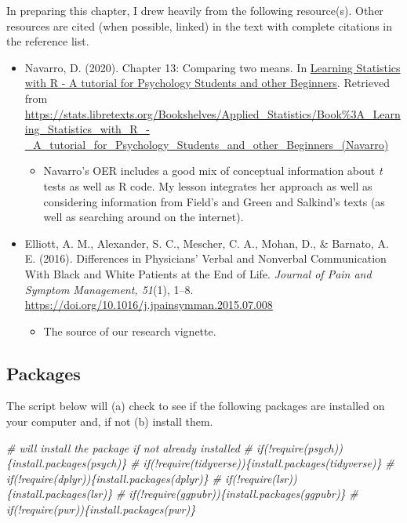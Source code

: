 \documentclass[
  11pt,
]{book}
\newenvironment{Shaded}{\begin{snugshade}}{\end{snugshade}}
\newcommand{\CommentTok}[1]{\textcolor[rgb]{0.56,0.35,0.01}{\textit{#1}}}
\providecommand{\tightlist}{%
  \setlength{\itemsep}{0pt}\setlength{\parskip}{0pt}}
\begin{document}
In preparing this chapter, I drew heavily from the following resource(s). Other resources are cited (when possible, linked) in the text with complete citations in the reference list.

\begin{itemize}
\tightlist
\item
  Navarro, D. (2020). Chapter 13: Comparing two means. In \href{https://learningstatisticswithr.com/}{Learning Statistics with R - A tutorial for Psychology Students and other Beginners}. Retrieved from \url{https://stats.libretexts.org/Bookshelves/Applied_Statistics/Book\%3A_Learning_Statistics_with_R_-_A_tutorial_for_Psychology_Students_and_other_Beginners_(Navarro)}

  \begin{itemize}
  \tightlist
  \item
    Navarro's OER includes a good mix of conceptual information about \emph{t} tests as well as R code. My lesson integrates her approach as well as considering information from Field's \citeyearpar{field_discovering_2012} and Green and Salkind's \citeyearpar{green_using_2014} texts (as well as searching around on the internet).
  \end{itemize}
\item
  Elliott, A. M., Alexander, S. C., Mescher, C. A., Mohan, D., \& Barnato, A. E. (2016). Differences in Physicians' Verbal and Nonverbal Communication With Black and White Patients at the End of Life. \emph{Journal of Pain and Symptom Management, 51}(1), 1--8. \url{https://doi.org/10.1016/j.jpainsymman.2015.07.008}

  \begin{itemize}
  \tightlist
  \item
    The source of our research vignette.
  \end{itemize}
\end{itemize}

\hypertarget{packages-1}{%
\subsection{Packages}\label{packages-1}}

The script below will (a) check to see if the following packages are installed on your computer and, if not (b) install them.

\begin{Shaded}
\begin{Highlighting}[]
\CommentTok{\# will install the package if not already installed}
\CommentTok{\# if(!require(psych))\{install.packages(\textquotesingle{}psych\textquotesingle{})\}}
\CommentTok{\# if(!require(tidyverse))\{install.packages(\textquotesingle{}tidyverse\textquotesingle{})\}}
\CommentTok{\# if(!require(dplyr))\{install.packages(\textquotesingle{}dplyr\textquotesingle{})\}}
\CommentTok{\# if(!require(lsr))\{install.packages(\textquotesingle{}lsr\textquotesingle{})\}}
\CommentTok{\# if(!require(ggpubr))\{install.packages(\textquotesingle{}ggpubr\textquotesingle{})\}}
\CommentTok{\# if(!require(pwr))\{install.packages(\textquotesingle{}pwr\textquotesingle{})\}}
\end{Highlighting}
\end{Shaded}
\end{document}
